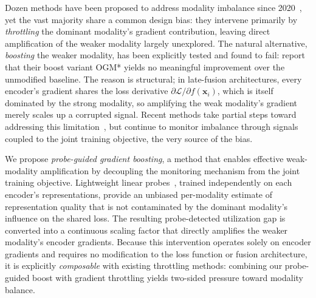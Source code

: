 \documentclass{article}
\newcommand{\loss}{\mathcal{L}}
\begin{document}

Dozen methods have been proposed to address modality imbalance since 2020~\citep{peng2022ogmge,li2023agm,wei2024mmpareto,guo2024cggm,wei2024opm,fan2023pmr,kontras2024mlgm,gao2025arm,huang2025inforeg,wei2025arl}, yet the vast majority share a common design bias: they intervene primarily by \emph{throttling} the dominant modality's gradient contribution, leaving direct amplification of the weaker modality largely unexplored. The natural alternative, \emph{boosting} the weaker modality, has been explicitly tested and found to fail: \citet{wei2024opm} report that their boost variant OGM* yields no meaningful improvement over the unmodified baseline. The reason is structural; in late-fusion architectures, every encoder's gradient shares the loss derivative $\partial \loss / \partial f(\mathbf{x}_i)$, which is itself dominated by the strong modality, so amplifying the weak modality's gradient merely scales up a corrupted signal. Recent methods take partial steps toward addressing this limitation~\citep{yang2025iprm,jiang2025aug}, but continue to monitor imbalance through signals coupled to the joint training objective, the very source of the bias.


We propose \emph{probe-guided gradient boosting}, a method that enables effective weak-modality amplification by decoupling the monitoring mechanism from the joint training objective. Lightweight linear probes~\citep{alain2017understanding}, trained independently on each encoder's representations, provide an unbiased per-modality estimate of representation quality that is not contaminated by the dominant modality's influence on the shared loss. The resulting probe-detected utilization gap is converted into a continuous scaling factor that directly amplifies the weaker modality's encoder gradients. Because this intervention operates solely on encoder gradients and requires no modification to the loss function or fusion architecture, it is explicitly \emph{composable} with existing throttling methods: combining our probe-guided boost with gradient throttling yields two-sided pressure toward modality balance.
\end{document}
